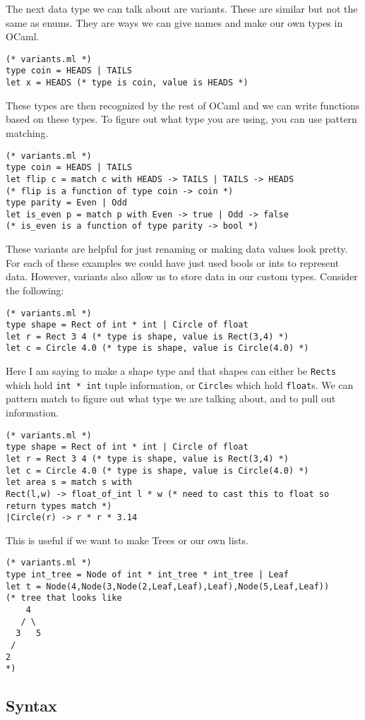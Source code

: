 \documentclass[main.tex]{subfiles}
\begin{document}
The next data type we can talk about are variants. These are similar but not the same as enums. They are ways we can give names and make our own types in OCaml. 
\begin{lstlisting}[style=Myocamlstyle]
(* variants.ml *)
type coin = HEADS | TAILS
let x = HEADS (* type is coin, value is HEADS *)
\end{lstlisting}
These types are then recognized by the rest of OCaml and we can write functions based on these types. To figure out what type you are using, you can use pattern matching.
\begin{lstlisting}[style=Myocamlstyle]
(* variants.ml *)
type coin = HEADS | TAILS
let flip c = match c with HEADS -> TAILS | TAILS -> HEADS
(* flip is a function of type coin -> coin *)
type parity = Even | Odd
let is_even p = match p with Even -> true | Odd -> false
(* is_even is a function of type parity -> bool *)
\end{lstlisting}
These variants are helpful for just renaming or making data values look pretty. For each of these examples we could have just used bools or ints to represent data. However, variants also allow us to store data in our custom types. Consider the following:
\begin{lstlisting}[style=Myocamlstyle]
(* variants.ml *)
type shape = Rect of int * int | Circle of float
let r = Rect 3 4 (* type is shape, value is Rect(3,4) *)
let c = Circle 4.0 (* type is shape, value is Circle(4.0) *)
\end{lstlisting}
Here I am saying to make a shape type and that shapes can either be \texttt{Rects} which hold \texttt{int * int} tuple information, or \texttt{Circle}s which hold \texttt{float}s. We can pattern match to figure out what type we are talking about, and to pull out information.  
\begin{lstlisting}[style=Myocamlstyle]
(* variants.ml *)
type shape = Rect of int * int | Circle of float
let r = Rect 3 4 (* type is shape, value is Rect(3,4) *)
let c = Circle 4.0 (* type is shape, value is Circle(4.0) *)
let area s = match s with 
Rect(l,w) -> float_of_int l * w (* need to cast this to float so return types match *)
|Circle(r) -> r * r * 3.14
\end{lstlisting}
This is useful if we want to make Trees or our own lists. 
\begin{lstlisting}[style=Myocamlstyle]
(* variants.ml *)
type int_tree = Node of int * int_tree * int_tree | Leaf
let t = Node(4,Node(3,Node(2,Leaf,Leaf),Leaf),Node(5,Leaf,Leaf))
(* tree that looks like 
    4
   / \
  3   5
 /
2
*)
\end{lstlisting}
\subsection{Syntax}
\end{document}
